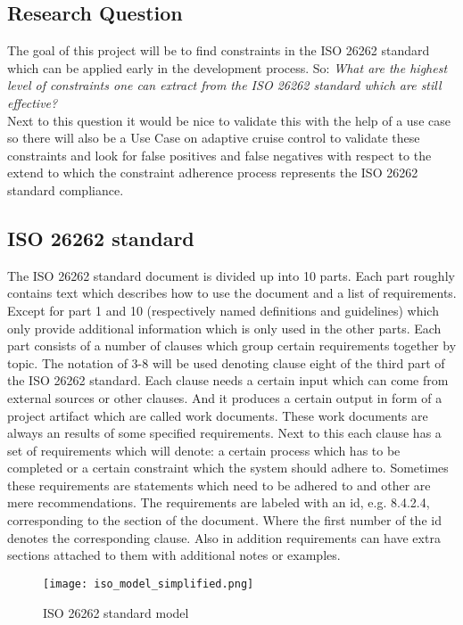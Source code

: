 \documentclass[a4paper]{article}
\newcommand{\ISO}{ISO 26262 standard\xspace}
\begin{document}
\subsection{Research Question}
The goal of this project will be to find constraints in the \ISO which can be applied early in the development process. So: \textit{What are the highest level of constraints one can extract from the \ISO which are still effective?}\\
Next to this question it would be nice to validate this with the help of a use case so there will also be a Use Case on adaptive cruise control to validate these constraints and look for false positives and false negatives with respect to the extend to which the constraint adherence process represents the \ISO compliance.

\subsection{\ISO}
The \ISO document is divided up into 10 parts. Each part roughly contains text which describes how to use the document and a list of requirements. Except for part 1 and 10 (respectively named definitions and guidelines) which only provide additional information which is only used in the other parts.
Each part consists of a number of clauses which group certain requirements together by topic.
The notation of 3-8 will be used denoting clause eight of the third part of the \ISO.
Each clause needs a certain input which can come from external sources or other clauses.
And it produces a certain output in form of a project artifact which are called work documents. These work documents are always an results of some specified requirements.
Next to this each clause has a set of requirements which will denote: a certain process which has to be completed or a certain constraint which the system should adhere to.
Sometimes these requirements are statements which need to be adhered to and other are mere recommendations.
The requirements are labeled with an id, e.g. 8.4.2.4, corresponding to the section of the document. Where the first number of the id denotes the corresponding clause.
Also in addition requirements can have extra sections attached to them with additional notes or examples.

\begin{figure}[h]
\centering
\texttt{[image: iso\_model\_simplified.png]}
\caption{\ISO model}
\label{fig:iso_model_simplified}
\end{figure}
\end{document}
